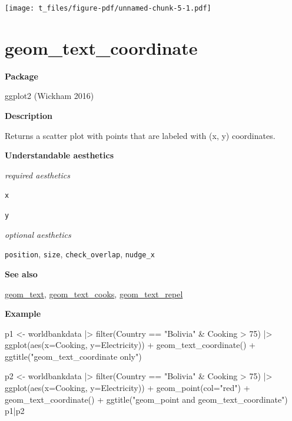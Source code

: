 \documentclass[
  letterpaper,
  DIV=11,
  numbers=noendperiod]{scrreprt}
\newenvironment{Shaded}{\begin{snugshade}}{\end{snugshade}}
\newcommand{\AttributeTok}[1]{\textcolor[rgb]{0.40,0.45,0.13}{#1}}
\newcommand{\DecValTok}[1]{\textcolor[rgb]{0.68,0.00,0.00}{#1}}
\newcommand{\FunctionTok}[1]{\textcolor[rgb]{0.28,0.35,0.67}{#1}}
\newcommand{\NormalTok}[1]{\textcolor[rgb]{0.00,0.23,0.31}{#1}}
\newcommand{\OtherTok}[1]{\textcolor[rgb]{0.00,0.23,0.31}{#1}}
\newcommand{\SpecialCharTok}[1]{\textcolor[rgb]{0.37,0.37,0.37}{#1}}
\newcommand{\StringTok}[1]{\textcolor[rgb]{0.13,0.47,0.30}{#1}}
\begin{document}
\texttt{[image: t\_files/figure-pdf/unnamed-chunk-5-1.pdf]}

\section{geom\_text\_coordinate}\label{text_coordinate}

\textbf{Package}

ggplot2 (Wickham 2016)

\textbf{Description}

Returns a scatter plot with points that are labeled with (x, y)
coordinates.

\textbf{Understandable aesthetics}

\emph{required aesthetics}

\texttt{x}

\texttt{y}

\emph{optional aesthetics}

\texttt{position}, \texttt{size}, \texttt{check\_overlap},
\texttt{nudge\_x}

\textbf{See also}

\hyperref[text]{geom\_text}, \hyperref[text_cooks]{geom\_text\_cooks},
\hyperref[text_repel]{geom\_text\_repel}

\textbf{Example}

\begin{Shaded}
\begin{Highlighting}[]
\NormalTok{p1 }\OtherTok{\textless{}{-}}\NormalTok{ worldbankdata }\SpecialCharTok{|\textgreater{}}
  \FunctionTok{filter}\NormalTok{(Country }\SpecialCharTok{==} \StringTok{"Bolivia"} \SpecialCharTok{\&}\NormalTok{ Cooking }\SpecialCharTok{\textgreater{}} \DecValTok{75}\NormalTok{) }\SpecialCharTok{|\textgreater{}}
  \FunctionTok{ggplot}\NormalTok{(}\FunctionTok{aes}\NormalTok{(}\AttributeTok{x=}\NormalTok{Cooking, }\AttributeTok{y=}\NormalTok{Electricity)) }\SpecialCharTok{+} 
  \FunctionTok{geom\_text\_coordinate}\NormalTok{() }\SpecialCharTok{+}
  \FunctionTok{ggtitle}\NormalTok{(}\StringTok{"geom\_text\_coordinate only"}\NormalTok{)}

\NormalTok{p2 }\OtherTok{\textless{}{-}}\NormalTok{ worldbankdata }\SpecialCharTok{|\textgreater{}}
  \FunctionTok{filter}\NormalTok{(Country }\SpecialCharTok{==} \StringTok{"Bolivia"} \SpecialCharTok{\&}\NormalTok{ Cooking }\SpecialCharTok{\textgreater{}} \DecValTok{75}\NormalTok{) }\SpecialCharTok{|\textgreater{}}
  \FunctionTok{ggplot}\NormalTok{(}\FunctionTok{aes}\NormalTok{(}\AttributeTok{x=}\NormalTok{Cooking, }\AttributeTok{y=}\NormalTok{Electricity)) }\SpecialCharTok{+} 
  \FunctionTok{geom\_point}\NormalTok{(}\AttributeTok{col=}\StringTok{"red"}\NormalTok{) }\SpecialCharTok{+}
  \FunctionTok{geom\_text\_coordinate}\NormalTok{() }\SpecialCharTok{+}
  \FunctionTok{ggtitle}\NormalTok{(}\StringTok{"geom\_point and geom\_text\_coordinate"}\NormalTok{)}
\NormalTok{p1}\SpecialCharTok{|}\NormalTok{p2}
\end{Highlighting}
\end{Shaded}
\end{document}

